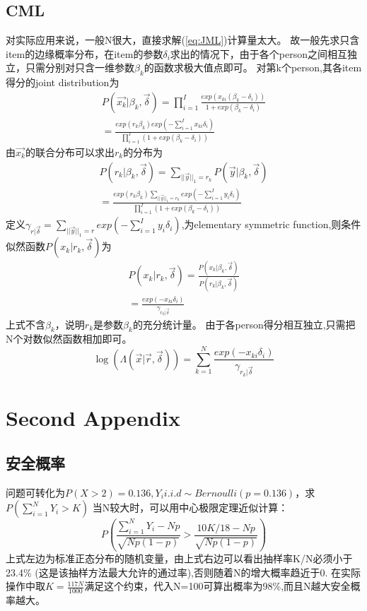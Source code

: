 \documentclass[12pt]{article}
\begin{document}
\subsection{CML}
对实际应用来说，一般N很大，直接求解(\ref{eq:JML})计算量太大。
故一般先求只含item的边缘概率分布，在item的参数$\delta_i$求出的情况下，由于各个person之间相互独立，只需分别对只含一维参数$\beta_k$的函数求极大值点即可。
对第k个person,其各item得分的joint distribution为
\begin{equation}
\begin{split}
P(\vec{x_k}|\beta_k,\vec{\delta})=\prod_{i=1}^I \frac{exp(x_{ki}(\beta_k-\delta_i))}{1+exp(\beta_k-\delta_i)}\\
=\frac{exp(r_k\beta_k)exp(-\sum_{i=1}^I x_{ki}\delta_i)}{\prod_{i=1}^I (1+exp(\beta_k-\delta_i))}
\end{split}
\end{equation}
由$\vec{x_k}$的联合分布可以求出$r_k$的分布为
\begin{equation}
\begin{split}
P(r_k|\beta_k,\vec{\delta})=\sum_{||\vec{y}||_1=r_k}P(\vec{y}|\beta_k,\vec{\delta})\\
=\frac{exp(r_k\beta_k)\displaystyle\sum_{||\vec{y}||_1=r_k}exp(-\sum_{i=1}^I y_{i}\delta_i)}{\prod_{i=1}^I (1+exp(\beta_k-\delta_i))}
\end{split}
\end{equation}
定义$\gamma_{r|\vec{\delta}}=\displaystyle\sum_{||\vec{y}||_1=r}exp(-\sum_{i=1}^I y_{i}\delta_i)$,为elementary symmetric function,则条件似然函数$P(x_k|r_k,\vec{\delta})$为
\begin{equation}
\begin{split}
P(x_k|r_k,\vec{\delta})=\frac{P(x_k|\beta_k,\vec{\delta})}{P(r_k|\beta_k,\vec{\delta})}\\
=\frac{exp(-x_{ki}\delta_i)}{\gamma_{r_k|\vec{\delta}}}
\end{split}
\end{equation}
上式不含$\beta_k$，说明$r_k$是参数$\beta_k$的充分统计量。
由于各person得分相互独立,只需把N个对数似然函数相加即可。
\begin{equation}
\log(\Lambda(\vec{x}|\vec{r},\vec{\delta}))=\sum_{k=1}^N \frac{exp(-x_{ki}\delta_i)}{\gamma_{r_k|\vec{\delta}}}
\end{equation}
\section{Second Appendix}
\subsection{安全概率}\label{A2}
问题可转化为$P(X>2)=0.136,Y_i i.i.d \sim Bernoulli(p=0.136)$，求$P(\displaystyle\sum_{i=1}^N Y_i >K)$
当N较大时，可以用中心极限定理近似计算：
\begin{equation}
P(\frac{\sum_{i=1}^N Y_i-Np}{\sqrt{Np(1-p)}}>\frac{10K/18-Np}{\sqrt{Np(1-p)}})
\end{equation}
上式左边为标准正态分布的随机变量，由上式右边可以看出抽样率K/N必须小于23.4\% (这是该抽样方法最大允许的通过率),否则随着N的增大概率趋近于0.
在实际操作中取$K=\frac{117N}{1000}$满足这个约束，代入N=100可算出概率为98\%,而且N越大安全概率越大。
\end{document}
